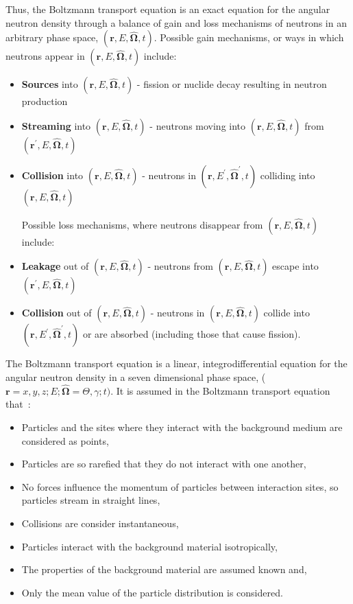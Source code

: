 \noindent
	\indent Thus, the Boltzmann transport equation is an exact equation for the angular neutron
	density through a balance of gain and loss mechanisms of neutrons in an arbitrary
	phase space, ${(\mathbf{r},E,\mathbf{\hat{\Omega}},t)}$. Possible gain mechanisms, or
	ways in which neutrons appear in ${(\mathbf{r},E,\mathbf{\hat{\Omega}},t)}$ include:

\begin{itemize}
	\item \textbf{Sources} into ${(\mathbf{r},E,\mathbf{\hat{\Omega}},t)}$ - fission or nuclide decay
		resulting in neutron production
	\item \textbf{Streaming} into ${(\mathbf{r},E,\mathbf{\hat{\Omega}},t)}$ - neutrons moving into
	${(\mathbf{r},E,\mathbf{\hat{\Omega}},t)}$ from ${(\mathbf{r}^{'},E,\mathbf{\hat{\Omega}},t)}$
	\item \textbf{Collision} into ${(\mathbf{r},E,\mathbf{\hat{\Omega}},t)}$ - neutrons in
	${(\mathbf{r},{E}^{'},\mathbf{\hat{\Omega}}^{'},t)}$ colliding into
	${(\mathbf{r},E,\mathbf{\hat{\Omega}},t)}$
		
	Possible loss mechanisms, where neutrons disappear from 
	${(\mathbf{r},E,\mathbf{\hat{\Omega}},t)}$ include:
	
	\item \textbf{Leakage} out of ${(\mathbf{r},E,\mathbf{\hat{\Omega}},t)}$ - neutrons from 
	${(\mathbf{r},E,\mathbf{\hat{\Omega}},t)}$ escape into ${(\mathbf{r}^{'},E,\mathbf{\hat{\Omega}},t)}$
	\item \textbf{Collision} out of ${(\mathbf{r},E,\mathbf{\hat{\Omega}},t)}$ - neutrons in
	${(\mathbf{r},E,\mathbf{\hat{\Omega}},t)}$ collide into
	${(\mathbf{r},{E}^{'},\mathbf{\hat{\Omega}}^{'},t)}$ or are absorbed (including
	those that cause fission).	
\end{itemize}
\noindent
	The Boltzmann transport equation is a linear, integrodifferential equation for 
	the angular neutron density in a seven dimensional phase space,
	($\mathbf{r}=x,y,z;{E};\mathbf{\hat{\Omega}}=\Theta,\gamma;t)$.  It is assumed in the
	Boltzmann transport equation that~\cite{Lew:93}:
\begin{itemize}
	\item Particles and the sites where they interact with the background medium are considered
	as points,
	\item Particles are so rarefied that they do not interact with one another,
	\item No forces influence the momentum of particles between interaction sites, so particles
		stream in straight lines,
	\item Collisions are consider instantaneous,
	\item Particles interact with the background material isotropically,
	\item The properties of the background material are assumed known and, 
	\item Only the mean value of the particle distribution is considered.
\end{itemize}
 
